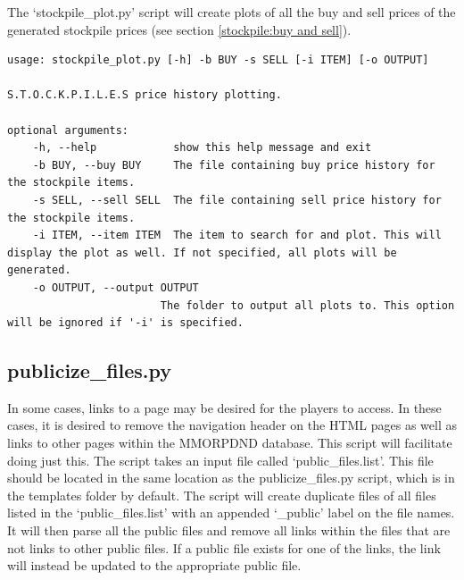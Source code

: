 The `stockpile\_plot.py' script will create plots of all the buy and sell prices of the generated stockpile prices (see section \ref{stockpile:buy and sell}).

\begin{lstlisting}
usage: stockpile_plot.py [-h] -b BUY -s SELL [-i ITEM] [-o OUTPUT]

S.T.O.C.K.P.I.L.E.S price history plotting.

optional arguments:
	-h, --help            show this help message and exit
	-b BUY, --buy BUY     The file containing buy price history for the stockpile items.
	-s SELL, --sell SELL  The file containing sell price history for the stockpile items.
	-i ITEM, --item ITEM  The item to search for and plot. This will display the plot as well. If not specified, all plots will be generated.
	-o OUTPUT, --output OUTPUT
	                    The folder to output all plots to. This option will be ignored if '-i' is specified.
\end{lstlisting}




\subsection{publicize\_files.py}

In some cases, links to a page may be desired for the players to access. In these cases, it is desired to remove the navigation header on the HTML pages as well as links to other pages within the MMORPDND database. This script will facilitate doing just this. The script takes an input file called `public\_files.list'. This file should be located in the same location as the publicize\_files.py script, which is in the templates folder by default. The script will create duplicate files of all files listed in the `public\_files.list' with an appended `\_public' label on the file names. It will then parse all the public files and remove all links within the files that are not links to other public files. If a public file exists for one of the links, the link will instead be updated to the appropriate public file.




